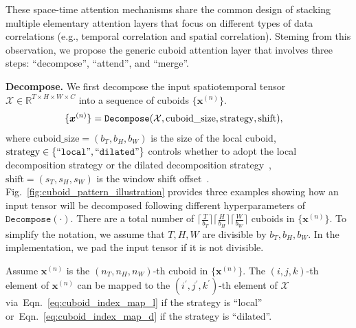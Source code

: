 \documentclass{article}
\newcommand{\figref}[1]{Fig.~\ref{#1}}
\newcommand{\eqnref}[1]{Eqn.~\ref{#1}}
\renewcommand{\paragraph}[1]{\textbf{#1. }}
\begin{document}
These space-time attention mechanisms share the common design of stacking multiple elementary attention layers that focus on different types of data correlations (e.g., temporal correlation and spatial correlation). Steming from this observation, we propose the generic cuboid attention layer that involves three steps: ``decompose'', ``attend'', and ``merge''.












\paragraph{Decompose}
We first decompose the input spatiotemporal tensor $\mathcal{X}\in\mathbb{R}^{T\times H\times W\times C}$ into a sequence of cuboids $\{\bm{x}^{(n)}\}$.
\begin{align}
    \centering
    \{\bm{x}^{(n)}\} &= \mathtt{Decompose}(\mathcal{X}, \text{cuboid\_size}, \text{strategy}, \text{shift}),
    \label{eq:cuboid_decompose}
\end{align}
where $\text{cuboid\_size}=(b_T,b_H,b_W)$ is the size of the local cuboid, $\text{strategy}\in\{\mathtt{``local"}, \mathtt{``dilated"}\}$ controls whether to adopt the local decomposition strategy or the dilated decomposition strategy~\cite{bertasius2021space}, $\text{shift} = (s_T, s_H, s_W)$ is the window shift offset~\cite{liu2021swin}.
\figref{fig:cuboid_pattern_illustration} provides three examples showing how an input tensor will be decomposed following different hyperparameters of $\mathtt{Decompose}(\cdot)$.
There are a total number of $\lceil \frac{T}{b_T}\rceil\lceil \frac{H}{b_H}\rceil\lceil \frac{W}{b_W}\rceil $ cuboids in $\{\bm{x}^{(n)}\}$. To simplify the notation, we assume that $T, H, W$ are divisible by $b_T, b_H, b_W$. In the implementation, we pad the input tensor if it is not divisible.

Assume $\bm{x}^{(n)}$ is the $(n_T, n_H, n_W)$-th cuboid in $\{\bm{x}^{(n)}\}$. 
The $(i, j, k)$-th element of $\bm{x}^{(n)}$ can be mapped to the $(i^\prime, j^\prime, k^\prime)$-th element of $\mathcal{X}$ via~\eqnref{eq:cuboid_index_map_l} if the strategy is ``local'' or~\eqnref{eq:cuboid_index_map_d} if the strategy is ``dilated''. 
\end{document}
